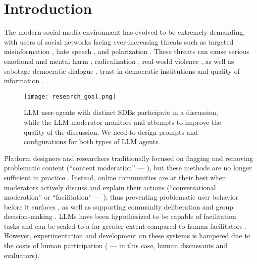 %
\section{Introduction}
\label{sec:introduction}

The modern social media environment has evolved to be extremely demanding, with users of social networks facing ever-increasing threats such as targeted misinformation \cite{clemons2025disinformation, Denniss2025Social}, hate speech \cite{kolluri2025parler}, and polarization \cite{pranesh2024impactsocialmediapolarization}. These threats can cause serious emotional and mental harm \citep{proactive_moderation}, radicalization \citep{cho-etal-2024-language}, real-world violence \citep{schaffner_community_guidelines}, as well as sabotage democratic dialogue \citep{esau2017design, falk-etal-2021-predicting, seering_self_moderation}, trust in democratic institutions \citep{schroeder-etal-2024-fora} and quality of information \citep{make_reddit_great}.

\begin{figure}[t]
	\centering
	\texttt{[image: research\_goal.png]}
	\caption{\ac{LLM} user-agents with distinct \acp{SDB} participate in a discussion, while the \ac{LLM} moderator monitors and attempts to improve the quality of the discussion. We need to design prompts and configurations for both types of \ac{LLM} agents.}
	\label{fig::goals}
\end{figure}


Platform designers and researchers traditionally focused on flagging and removing problematic content (``content moderation'' --- \citet{seering_self_moderation, cresci_pesonalized_interventions}), but these methods are no longer sufficient in practice \cite{horta_automated_moderation, schaffner_community_guidelines, small-polis-llm, korre2025evaluation}. Instead, online communities are at their best when moderators actively discuss and explain their actions (``conversational moderation'' or ``facilitation'' --- \citet{argyle2023, korre2025evaluation, falk-etal-2021-predicting}); thus preventing problematic user behavior before it surfaces \cite{cho-etal-2024-language, seering_self_moderation, cresci_pesonalized_interventions, make_reddit_great}, as well as supporting community deliberation and group decision-making \cite{kim_et_al_chatbot, seering_self_moderation}. \acfp{LLM} have been hypothesized to be capable of facilitation tasks and can be scaled to a far greater extent compared to human facilitators \cite{korre2025evaluation, small-polis-llm}. However, experimentation and development on these systems is hampered due to the costs of human participation (\citet{rossi_2024} --- in this case, human discussants and evaluators). 


